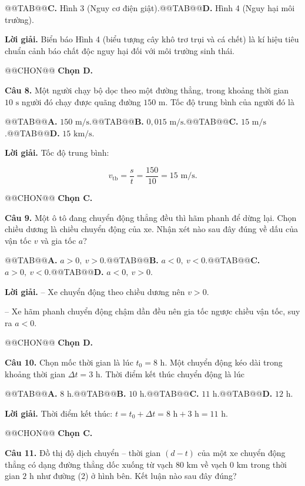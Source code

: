 \documentclass{article}
\begin{document}
@@TAB@@\textbf{C.} Hình 3 (Nguy cơ điện giật).@@TAB@@\textbf{D.} Hình 4 (Nguy hại môi trường).

\textbf{Lời giải.} Biển báo Hình 4 (biểu tượng cây khô trơ trụi và cá chết) là kí hiệu tiêu chuẩn cảnh báo chất độc nguy hại đối với môi trường sinh thái.

@@CHON@@ \textbf{Chọn D.}

\textbf{Câu 8.} Một người chạy bộ dọc theo một đường thẳng, trong khoảng thời gian $10\text{ s}$ người đó chạy được quãng đường $150\text{ m}$. Tốc độ trung bình của người đó là

@@TAB@@\textbf{A.} $150\text{ m/s}$.@@TAB@@\textbf{B.} $0{,}015\text{ m/s}$.@@TAB@@\textbf{C.} $15\text{ m/s}$.@@TAB@@\textbf{D.} $15\text{ km/s}$.

\textbf{Lời giải.} Tốc độ trung bình:

\[v_{\text{tb}} = \frac{s}{t} = \frac{150}{10} = 15\text{ m/s}.\]

@@CHON@@ \textbf{Chọn C.}

\textbf{Câu 9.} Một ô tô đang chuyển động thẳng đều thì hãm phanh để dừng lại. Chọn chiều dương là chiều chuyển động của xe. Nhận xét nào sau đây đúng về dấu của vận tốc $v$ và gia tốc $a$?

@@TAB@@\textbf{A.} $a > 0,\ v > 0$.@@TAB@@\textbf{B.} $a < 0,\ v < 0$.@@TAB@@\textbf{C.} $a > 0,\ v < 0$.@@TAB@@\textbf{D.} $a < 0,\ v > 0$.

\textbf{Lời giải.} -- Xe chuyển động theo chiều dương nên $v > 0$.

-- Xe hãm phanh chuyển động chậm dần đều nên gia tốc ngược chiều vận tốc, suy ra $a < 0$.

@@CHON@@ \textbf{Chọn D.}

\textbf{Câu 10.} Chọn mốc thời gian là lúc $t_0 = 8\text{ h}$. Một chuyển động kéo dài trong khoảng thời gian $\Delta t = 3\text{ h}$. Thời điểm kết thúc chuyển động là lúc

@@TAB@@\textbf{A.} $8\text{ h}$.@@TAB@@\textbf{B.} $10\text{ h}$.@@TAB@@\textbf{C.} $11\text{ h}$.@@TAB@@\textbf{D.} $12\text{ h}$.

\textbf{Lời giải.} Thời điểm kết thúc: $t = t_0 + \Delta t = 8\text{ h} + 3\text{ h} = 11\text{ h}$.

@@CHON@@ \textbf{Chọn C.}

\textbf{Câu 11.} Đồ thị độ dịch chuyển -- thời gian $(d - t)$ của một xe chuyển động thẳng có dạng đường thẳng dốc xuống từ vạch $80\text{ km}$ về vạch $0\text{ km}$ trong thời gian $2\text{ h}$ như đường (2) ở hình bên. Kết luận nào sau đây đúng?
\end{document}
